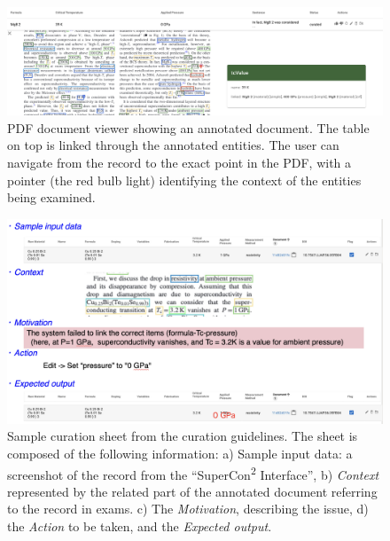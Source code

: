 \documentclass[]{interact}
\theoremstyle{plain} %
\theoremstyle{definition}
\theoremstyle{remark}
\begin{document}
\begin{figure}[ht]
  \centering
  \includegraphics[width=1\textwidth]{images/pdf-view-context.png} 
  \caption{PDF document viewer showing an annotated document. The table on top is linked through the annotated entities. The user can navigate from the record to the exact point in the PDF, with a pointer (the red bulb light) identifying the context of the entities being examined. }
  \label{fig:pdf-view}
\end{figure}


\begin{figure}[ht]
  \centering
  \includegraphics[width=1\textwidth]{images/example-sheet-curation.png} 
  \caption{Sample curation sheet from the curation guidelines. The sheet is composed of the following information: a) {Sample input data}: a screenshot of the record from the ``SuperCon\textsuperscript{2} Interface'', b) \textit{Context} represented by the related part of the annotated document referring to the record in exams. c) The \textit{Motivation}, describing the issue, d) the \textit{Action} to be taken, and the \textit{Expected output}.
 }
  \label{fig:example-curation-sheet}
\end{figure}
\end{document}
